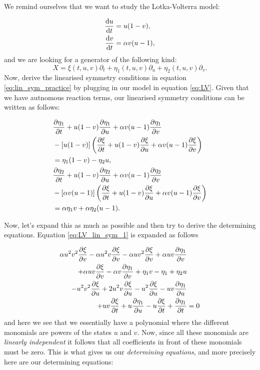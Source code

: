 We remind ourselves that we want to study the Lotka-Volterra model:

\begin{equation}
  \begin{split}
    \dv{u}{t}&=u(1-v),\\
    \dv{v}{t}&=\alpha v(u-1),\\    
    \end{split}
  \label{eq:LV}
\end{equation}
and we are looking for a generator of the following kind:
\begin{equation}
X=\xi(t,u,v)\partial_t+\eta_1(t,u,v)\partial_u+\eta_2(t,u,v)\partial_v.
\end{equation}
Now, derive the linearised symmetry conditions in equation \eqref{eq:lin_sym_practice} by plugging in our model in equation \eqref{eq:LV}. Given that we have autnomous reaction terms, our linearised symmetry conditions can be written as follows:


\begin{align}
    &\pdv{\eta_1}{t}+u(1-v)\pdv{\eta_1}{u}+\alpha v(u-1)\pdv{\eta_1}{v}\nonumber\\
    &-\left[u(1-v)\right]\left(\pdv{\xi}{t}+u(1-v)\pdv{\xi}{u}+\alpha v(u-1)\pdv{\xi}{v}\right)\label{eq:LV_lin_sym_1}\\
    &=\eta_1(1-v)-\eta_2 u,\nonumber\\
    &\pdv{\eta_2}{t}+u(1-v)\pdv{\eta_2}{u}+\alpha v(u-1)\pdv{\eta_2}{v}\nonumber\\
    &-\left[\alpha v(u-1)\right]\left(\pdv{\xi}{t}+u(1-v)\pdv{\xi}{u}+\alpha v(u-1)\pdv{\xi}{v}\right)\label{eq:LV_lin_sym_2}\\
    &=\alpha\eta_1 v+\alpha\eta_2(u-1).\nonumber
\end{align}




Now, let's expand this as much as possible and then try to derive the determining equations. Equation \eqref{eq:LV_lin_sym_1} is expanded as follows



\begin{align}
  \alpha u^{2} v^{2} \pdv{\xi}{v}  - \alpha u^{2} v \pdv{\xi}{v} - \alpha u v^{2} \pdv{\xi}{v} + \alpha u v \pdv{\eta_1}{v}&\nonumber\\
  + \alpha u v \pdv{\xi}{v}  - \alpha v \pdv{\eta_1}{v}  + \eta_1 v - \eta_1 + \eta_2 u &\nonumber\\
  - u^{2} v^{2} \pdv{\xi}{u}  + 2 u^{2} v \pdv{\xi}{u}  - u^{2} \pdv{\xi}{u}  - u v \pdv{\eta_1}{u}&\label{eq:LV_lin_sym_1_expanded}\\
  + u v \pdv{\xi}{t}+ u \pdv{\eta_1}{u}  - u \pdv{\xi}{t}+ \pdv{\eta_1}{t}&=0\nonumber
\end{align}
and here we see that we essentially have a polynomial where the different monomials are powers of the states $u$ and $v$. Now, since all these monomials are \textit{linearly independent} it follows that all coefficients in front of these monomials must be zero. This is what gives us our \textit{determining equations}, and more precisely here are our determining equations:



